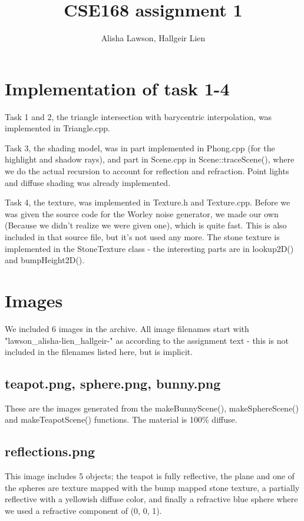 \documentclass{article} %
\title{CSE168 assignment 1}
\author{Alisha Lawson, Hallgeir Lien}
\date{} %
\begin{document}
\maketitle

\section{Implementation of task 1-4}
Task 1 and 2, the triangle intersection with barycentric interpolation, was implemented in Triangle.cpp.

Task 3, the shading model, was in part implemented in Phong.cpp (for the highlight and shadow rays), and part in Scene.cpp in Scene::traceScene(), where we do the actual recursion to account for reflection and refraction. Point lights and diffuse shading was already implemented.

Task 4, the texture, was implemented in Texture.h and Texture.cpp. Before we was given the source code for the Worley noise generator, we made our own (Because we didn't realize we were given one), which is quite fast. This is also included in that source file, but it's not used any more. The stone texture is implemented in the StoneTexture class - the interesting parts are in lookup2D() and bumpHeight2D().

\section{Images}
We included 6 images in the archive. All image filenames start with "lawson\_alisha-lien\_hallgeir-" as according to the assignment text - this is not included in the filenames listed here, but is implicit.

\subsection{teapot.png, sphere.png, bunny.png}
These are the images generated from the makeBunnyScene(), makeSphereScene() and makeTeapotScene() functions. The material is 100\% diffuse.

\subsection{reflections.png}
This image includes 5 objects; the teapot is fully reflective, the plane and one of the spheres are texture mapped with the bump mapped stone texture, a partially reflective with a yellowish diffuse color, and finally a refractive blue sphere where we used a refractive component of (0, 0, 1).
\end{document}
